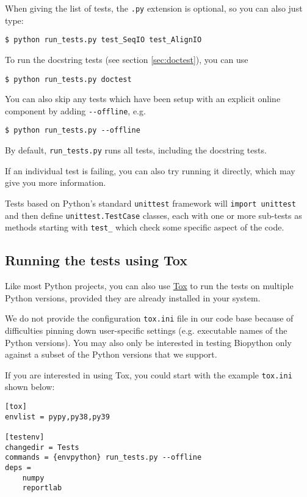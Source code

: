 When giving the list of tests, the \verb|.py| extension is optional,
so you can also just type:

\begin{verbatim}
$ python run_tests.py test_SeqIO test_AlignIO
\end{verbatim}

To run the docstring tests (see section \ref{sec:doctest}), you can use

\begin{verbatim}
$ python run_tests.py doctest
\end{verbatim}

You can also skip any tests which have been setup with an explicit
online component by adding \verb|--offline|, e.g.

\begin{verbatim}
$ python run_tests.py --offline
\end{verbatim}

By default, \verb|run_tests.py| runs all tests, including the docstring tests.

If an individual test is failing, you can also try running it
directly, which may give you more information.

Tests based on Python's standard  \verb|unittest| framework will
\verb|import unittest| and then define \verb|unittest.TestCase| classes,
each with one or more sub-tests as methods starting with \verb|test_| which
check some specific aspect of the code.

\subsection{Running the tests using Tox}

Like most Python projects, you can also use
\href{https://tox.readthedocs.org/en/latest/}{Tox} to run the tests on multiple
Python versions, provided they are already installed in your system.

We do not provide the configuration \texttt{tox.ini} file in our code base because
of difficulties pinning down user-specific settings (e.g. executable names of the
Python versions). You may also only be interested in testing Biopython only against
a subset of the Python versions that we support.

If you are interested in using Tox, you could start with the example
\texttt{tox.ini} shown below:

\begin{verbatim}
[tox]
envlist = pypy,py38,py39

[testenv]
changedir = Tests
commands = {envpython} run_tests.py --offline
deps =
    numpy
    reportlab
\end{verbatim}

